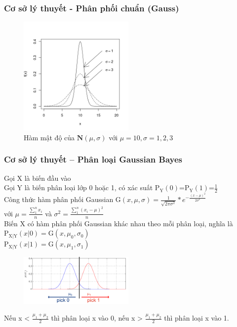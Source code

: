 \documentclass[t]{beamer}
\begin{document}

\begin{frame}[t]
\frametitle{Cơ sở lý thuyết - Phân phối chuẩn (Gauss)}
\begin{figure}[h]
  \centering
    \includegraphics[width=0.5\textwidth]{Normal_Distribution_PDF.png}   
    \caption*{Hàm mật độ của $\textbf{N}(\mu,\sigma)$ với $\mu=10, \sigma=1,2,3$} 
\end{figure}
\end{frame}


\begin{frame}[t]
\frametitle{Cơ sở lý thuyết -- Phân loại Gaussian Bayes}
Gọi X là biến đầu vào\\
Gọi Y là biến phân loại lớp 0 hoặc 1, có xác suất $\mathrm{P_Y}(0)$=$\mathrm{P_Y}(1)$=$\frac{1}{2}$\\
Công thức hàm phân phối Gaussian 
$
\mathrm{G}(x,\mu,\sigma)=\frac{1}{\sqrt{2\pi\sigma^2}} * e^{-\frac{(x-\mu)^2}{2\sigma^2}}  
$\\
với $\mu=\frac{\sum_1^n x_i}{n}$ và $\sigma^2=\frac{\sum_1^n (x_i-\mu)^2}{n}$\\
Biến X có hàm phân phối Gaussian khác nhau theo mỗi phân loại, nghĩa là \\
$\mathrm{P_{X|Y}}(x|0)=\mathrm{G}(x,\mu_0,\sigma_0)$\\
$\mathrm{P_{X|Y}}(x|1)=\mathrm{G}(x,\mu_1,\sigma_1)$\\
\begin{figure}[h]
  \centering
    \includegraphics[width=0.5\textwidth]{GaussBayesEx2.png}    
\end{figure}
Nếu x < $\frac{\mu_1+\mu_2}{2}$ thì phân loại x vào 0, nếu x > $\frac{\mu_1+\mu_2}{2}$ thì phân loại x vào 1.
\end{frame}
\end{document}
